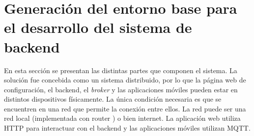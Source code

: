 \section{Generación del entorno base para el desarrollo del sistema de backend}
\label{Generación del entorno base para el desarrollo del sistema de backend}
 En esta sección se presentan las distintas partes que componen el sistema.
La solución fue concebida como un sistema distribuido, por lo que la página web de configuración, el backend, el \textit{broker} y las aplicaciones móviles pueden estar en distintos dispositivos físicamente. La única condición necesaria es que se encuentren en una red que permite la conexión entre ellos. La red puede ser una red local (implementada con router ) o bien internet.
La aplicación web utiliza HTTP para interactuar con el backend y las aplicaciones móviles utilizan MQTT.








	
		

